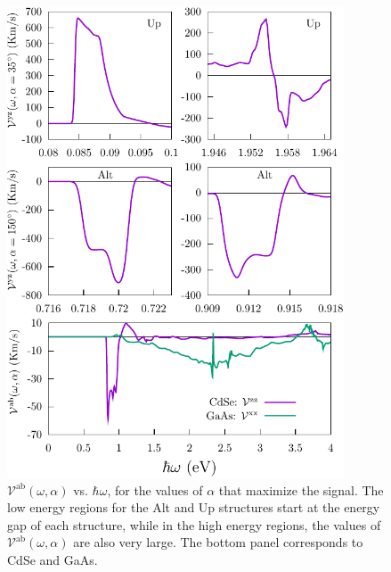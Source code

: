 \documentclass[floatfix,prb,aps,superscriptaddress,showpacs,11pt,preprint,letterpaper]{revtex4}
\def\tama{10cm}
\begin{document}
\begin{figure}[t]
\centering
\includegraphics[width=\tama]{figures/fig3}
\caption{$\mathcal{V}^{\mathrm{ab}}(\omega,\alpha)$ 
  vs. $\hbar\omega$, for the values of $\alpha$ that maximize the signal. The
  low energy regions for the Alt and Up structures start at the energy gap of
  each structure, while in the high energy regions, the values of
  $\mathcal{V}^{\mathrm{ab}}(\omega,\alpha)$ are also very large. The bottom
  panel corresponds to CdSe and GaAs. }
\label{fig:vab-str-comp}
\end{figure}
\end{document}
